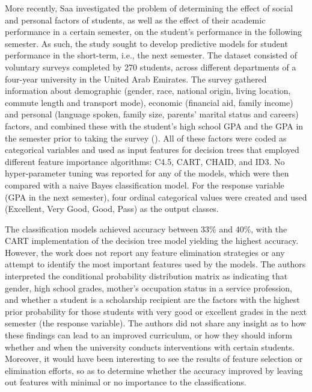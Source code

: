 More recently, Saa \cite{Saa} investigated the problem of determining the effect of social and personal factors of students, as well as the effect of their academic performance in a certain semester, on the student's performance in the following semester.  As such, the study sought to develop predictive models for student performance in the short-term, i.e., the next semester.  The dataset consisted of voluntary surveys completed by 270 students, across different departments of a four-year university in the United Arab Emirates.  The survey gathered information about demographic (gender, race, national origin, living location, commute length and transport mode), economic (financial aid, family income) and personal (language spoken, family size, parents' marital status and careers) factors, and combined these with the student's high school GPA and the GPA in the semester prior to taking the survey (\cite[Table 1]{Saa}).  All  of these factors were coded as categorical variables and used as input features for decision trees that employed different feature importance algorithms: C4.5, CART, CHAID, and ID3.  No hyper-parameter tuning was reported for any of the models, which were then compared with a naive Bayes classification model. For the response variable (GPA in the next semester), four ordinal categorical values were created and used (Excellent, Very Good, Good, Pass) as the output classes. 

The classification models achieved accuracy between 33\% and 40\%, with the CART implementation of the decision tree model yielding the highest accuracy.  However, the work does not report any feature elimination strategies or any attempt to identify the most important features used by the models.  The authors interpreted the conditional probability distribution matrix \cite[Table 5]{Saa} as indicating that gender, high school grades, mother's occupation status in a service profession, and whether a student is a scholarship recipient are the factors with the highest prior probability for those students with very good or excellent grades in the next semester (the response variable).  The authors did not share any insight as to how these findings can lead to an improved curriculum, or how they should inform whether and when the university conducts interventions with certain students.  Moreover, it would have been interesting to see the results of feature selection or elimination efforts, so as to determine whether the accuracy improved by leaving out features with minimal or no importance to the classifications.  

